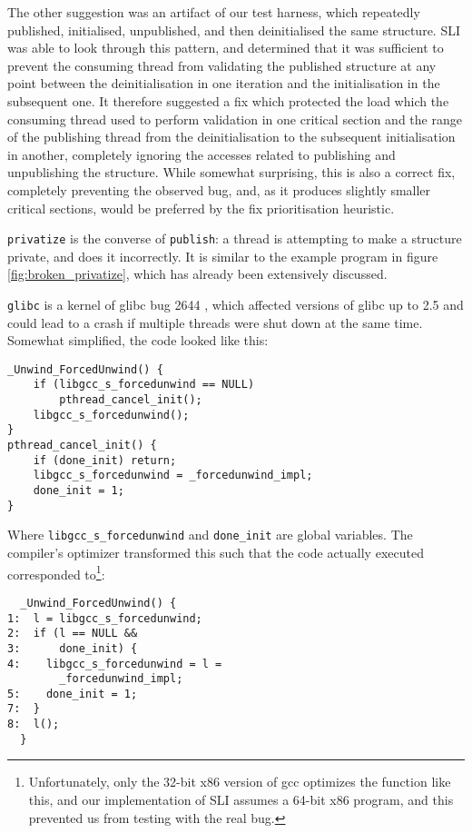 \documentclass[10pt,twocolumn,preprint,natbib,authoryear]{sigplanconf}
\newcommand{\editorial}[1]{}
\newcommand{\smh}[1]{\editorial{SMH says: #1}}
\begin{document}
The other suggestion was an artifact of our test harness, which
repeatedly published, initialised, unpublished, and then deinitialised
the same structure.  SLI was able to look through this pattern, and
determined that it was sufficient to prevent the consuming thread from
validating the published structure at any point between the
deinitialisation in one iteration and the initialisation in the
subsequent one.  It therefore suggested a fix which protected the load
which the consuming thread used to perform validation in one critical
section and the range of the publishing thread from the
deinitialisation to the subsequent initialisation in another,
completely ignoring the accesses related to publishing and
unpublishing the structure.  While somewhat surprising, this is also a
correct fix, completely preventing the observed bug, and, as it
produces slightly smaller critical sections, would be preferred by the
fix prioritisation heuristic.\smh{good example of a bad fix which is
  actually good.}\editorial{ref earlier discussion of privatize
  example?}

\verb|privatize| is the converse of \verb|publish|: a thread is
attempting to make a structure private, and does it incorrectly.  It
is similar to the example program in figure
\ref{fig:broken_privatize}, which has already been extensively
discussed.

\verb|glibc| is a kernel of glibc bug 2644 \cite{glibc2644}, which
affected versions of glibc up to 2.5 and could lead to a crash if
multiple threads were shut down at the same time.  Somewhat
simplified, the code looked like this:

\begin{verbatim}
_Unwind_ForcedUnwind() {
    if (libgcc_s_forcedunwind == NULL)
        pthread_cancel_init();
    libgcc_s_forcedunwind();
}
pthread_cancel_init() {
    if (done_init) return;
    libgcc_s_forcedunwind = _forcedunwind_impl;
    done_init = 1;
}
\end{verbatim}

Where \verb|libgcc_s_forcedunwind| and \verb|done_init| are global
variables.  The compiler's optimizer transformed this such that the
code actually executed corresponded to\footnote{Unfortunately, only
  the 32-bit x86 version of gcc optimizes the function like this, and
  our implementation of SLI assumes a 64-bit x86 program, and this
  prevented us from testing with the real bug.}:

\begin{verbatim}
  _Unwind_ForcedUnwind() {
1:  l = libgcc_s_forcedunwind;
2:  if (l == NULL &&
3:      done_init) {
4:    libgcc_s_forcedunwind = l =
        _forcedunwind_impl;
5:    done_init = 1;
7:  }
8:  l();
  }
\end{verbatim}
\end{document}
